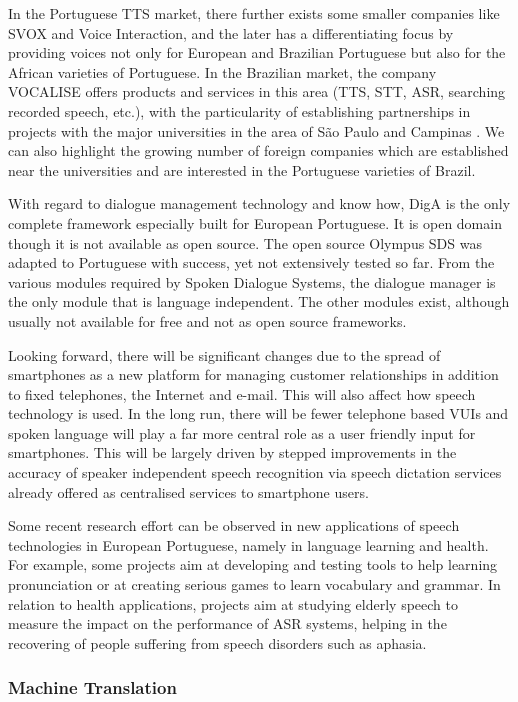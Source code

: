 \begin{multicols}{2}
In the Portuguese TTS market, there further exists some smaller companies like SVOX and Voice Interaction, and the later has a differentiating focus by providing voices not only for European and Brazilian Portuguese but also for the African varieties of Portuguese. In the Brazilian market, the company VOCALISE offers products and services in this area (TTS, STT, ASR, searching recorded speech, etc.), with the particularity of establishing partnerships in projects with the major universities in the area of São Paulo and Campinas \cite{neto}. We can also highlight the growing number of foreign companies which are established near the universities and are interested in the Portuguese varieties of Brazil.

    With regard to dialogue management technology and know how, DigA is the only complete framework especially built for European Portuguese. It is open domain though it is not available as open source. The open source Olympus SDS was adapted to Portuguese with success, yet not extensively tested so far. From the various modules required by Spoken Dialogue Systems, the dialogue manager is the only module that is language independent. The other modules exist, although usually not available for free and not as open source frameworks.

   Looking forward, there will be significant changes due to the spread of smartphones as a new platform for managing customer relationships in addition to fixed telephones, the Internet and e-mail. This will also affect how speech technology is used. In the long run, there will be fewer telephone based VUIs and spoken language will play a far more central role as a user friendly input for smartphones. This will be largely driven by stepped improvements in the accuracy of speaker independent speech recognition via speech dictation services already offered as centralised services to smartphone users. 

Some recent research effort can be observed in new applications of speech technologies in European Portuguese, namely in language learning and health. For example, some projects aim at developing and testing tools to help learning pronunciation or at creating serious games to learn vocabulary and grammar. In relation to health applications, projects aim at studying elderly speech to measure the impact on the performance of ASR systems, helping in the recovering of people suffering from speech disorders such as aphasia.

\subsubsection{Machine Translation}


\end{multicols}
